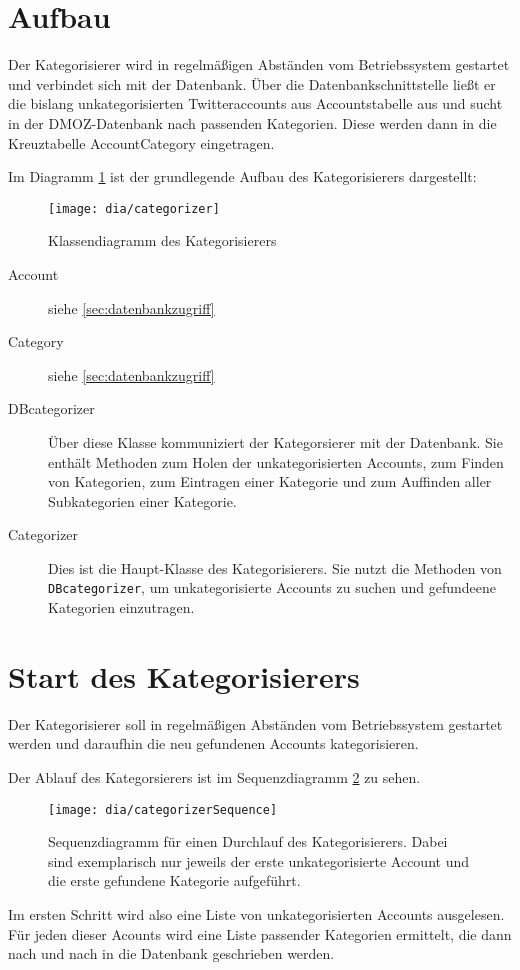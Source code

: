 \section{Aufbau}
Der Kategorisierer wird in regelmäßigen Abständen vom Betriebssystem gestartet und verbindet sich mit der Datenbank. Über die Datenbankschnittstelle ließt er die bislang unkategorisierten Twitteraccounts aus Accountstabelle aus und sucht in der DMOZ-Datenbank nach passenden Kategorien. Diese werden dann in die Kreuztabelle AccountCategory eingetragen.

Im Diagramm \ref{fig:categorizer} ist der grundlegende Aufbau des Kategorisierers dargestellt:
\begin{figure}[h!]
	\centering
	\texttt{[image: dia/categorizer]}
	\caption{Klassendiagramm des Kategorisierers}
	\label{fig:categorizer}
\end{figure}
\begin{description}
	\item[Account] siehe \cref{sec:datenbankzugriff}
	\item[Category] siehe \cref{sec:datenbankzugriff}
	\item[DBcategorizer] Über diese Klasse kommuniziert der Kategorsierer mit der Datenbank. Sie enthält Methoden zum Holen der unkategorisierten Accounts, zum Finden von Kategorien, zum Eintragen einer Kategorie und zum Auffinden aller Subkategorien einer Kategorie.
	\item[Categorizer] Dies ist die Haupt-Klasse des Kategorisierers. Sie nutzt die Methoden von \lstinline{DBcategorizer}, um unkategorisierte Accounts zu suchen und gefundeene Kategorien einzutragen.
\end{description}

\section{Start des Kategorisierers}
Der Kategorisierer soll in regelmäßigen Abständen vom Betriebssystem gestartet werden und daraufhin die neu gefundenen Accounts kategorisieren.

Der Ablauf des Kategorsierers ist im Sequenzdiagramm \ref{fig:categorizerSeq} zu sehen.
\begin{figure}[h!]
	\centering
	\texttt{[image: dia/categorizerSequence]}
	\caption{Sequenzdiagramm für einen Durchlauf des Kategorisierers. Dabei sind exemplarisch nur jeweils der erste unkategorisierte Account und die erste gefundene Kategorie aufgeführt.}
	\label{fig:categorizerSeq}
\end{figure}

Im ersten Schritt wird also eine Liste von unkategorisierten Accounts ausgelesen. Für jeden dieser Acounts wird eine Liste passender Kategorien ermittelt, die dann nach und nach in die Datenbank geschrieben werden.
